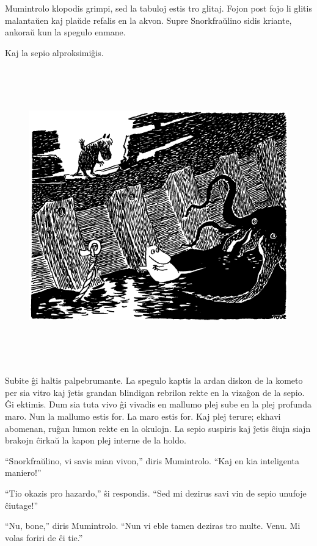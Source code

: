Mumintrolo klopodis grimpi, sed la tabuloj estis tro glitaj. Fojon post fojo li glitis malantaŭen kaj plaŭde refalis en la akvon. Supre Snorkfraŭlino sidis kriante, ankoraŭ kun la spegulo enmane.

Kaj la sepio alproksimiĝis.

\begin{figure}[htbp]
\centering
\includegraphics[width=449pt,height=364pt]{7-6.png}
\caption{}
\label{7-6}
\end{figure}

Subite ĝi haltis palpebrumante. La spegulo kaptis la ardan diskon de la kometo per sia vitro kaj ĵetis grandan blindigan rebrilon rekte en la vizaĝon de la sepio. Ĝi ektimis. Dum sia tuta vivo ĝi vivadis en mallumo plej sube en la plej profunda maro. Nun la mallumo estis for. La maro estis for. Kaj plej terure; ekhavi abomenan, ruĝan lumon rekte en la okulojn. La sepio suspiris kaj ĵetis ĉiujn siajn brakojn ĉirkaŭ la kapon plej interne de la holdo.

``Snorkfraŭlino, vi savis mian vivon,'' diris Mumintrolo. ``Kaj en kia inteligenta maniero!''

``Tio okazis pro hazardo,'' ŝi respondis. ``Sed mi dezirus savi vin de sepio unufoje ĉiutage!''

``Nu, bone,'' diris Mumintrolo. ``Nun vi eble tamen deziras tro multe. Venu. Mi volas foriri de ĉi tie.''

